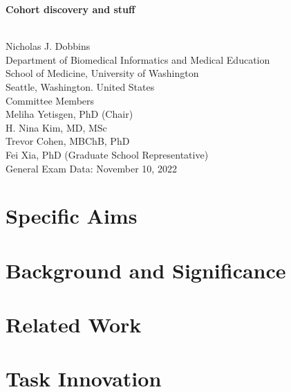 \documentclass[12pt]{article} %
\begin{document}
\begin{titlepage}
    \begin{center}
        \vspace*{1cm}
        \begin{huge}
            \textbf{Cohort discovery and stuff}
        \end{huge} \\
        \vspace{0.7cm}
        Nicholas J. Dobbins \\
        Department of Biomedical Informatics and Medical Education \\
        School of Medicine, University of Washington \\
        Seattle, Washington. United States \\
        \vspace{0.7cm}
        Committee Members \\
        Meliha Yetisgen, PhD (Chair) \\
        H. Nina Kim, MD, MSc \\
        Trevor Cohen, MBChB, PhD \\
        Fei Xia, PhD (Graduate School Representative) \\
        \vspace{0.7cm}
        General Exam Data: November 10, 2022
    \end{center}
\end{titlepage}

\tableofcontents
\newpage

\section{Specific Aims}
\label{sec:specific_aims}

\newpage

\section{Background and Significance}
\label{sec:background}


\section{Related Work}
\label{sec:related_work}


\section{Task Innovation}
\label{sec:task_innovation}

\end{document}
